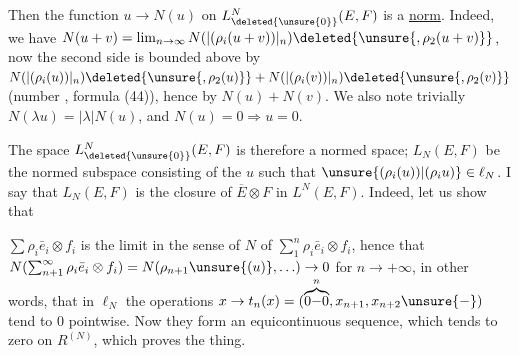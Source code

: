
 

Then the function $u\to N(u)$ on $L^N_{\deleted{\unsure{0}}}(E,F)$ is a \uline{norm}. Indeed, we have $N(u+v)=\lim_{n\to\infty}N(|(\rho_i(u+v))|_n)\deleted{\unsure{,\rho_2(u+v)}}$, now the second side is bounded above by $N(|(\rho_i(u))|_n)\deleted{\unsure{,\rho_2(u)}}+N(|(\rho_i(v))|_n)\deleted{\unsure{,\rho_2(v)}}$ (number , formula (44)), hence by $N(u)+N(v)$. We also note trivially $N(\lambda u)=|\lambda|N(u)$, and $N(u)=0\Rightarrow u=0$.


The space $L^N_{\deleted{\unsure{0}}}(E,F)$ is therefore a normed space;  $L_N(E,F)$ be the normed subspace consisting of the $u$ such that $\unsure{(\rho_i(u))|(\rho_i u)}\in\ell_N$. I say that $L_N(E,F)$ is the closure of $\overline E\otimes F$ in $L^N(E,F)$. Indeed, let us show that

$\sum\rho_i\bar e_i\otimes f_i$ is the limit in the sense of $N$ of $\sum_1^n\rho_i\bar e_i\otimes f_i$, hence that $N(\sum_{n+1}^\infty\rho_i\bar e_i\otimes f_i)=N(\rho_{n+1}\unsure{(u)},\ldots)\to 0$ for $n\to+\infty$, in other words, that in $\ell_N$ the operations $x\to t_n(x)=(\overbrace{0{-}0}^{n},x_{n+1},x_{n+2}\unsure{-})$ tend to $0$ pointwise. Now they form an equicontinuous sequence, which tends to zero on  $R^{(N)}$, which proves the thing. 



